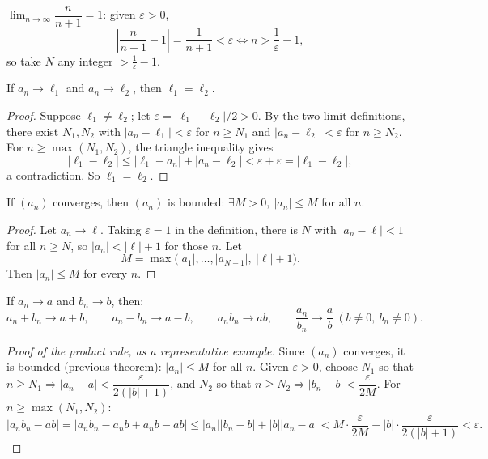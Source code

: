 \documentclass[11pt]{article}
\begin{document}
\begin{example}
$\lim_{n\to\infty}\dfrac{n}{n+1}=1$: given $\varepsilon>0$,
\[
\left|\frac{n}{n+1}-1\right| = \frac{1}{n+1} < \varepsilon \iff n > \frac1\varepsilon-1,
\]
so take $N$ any integer $>\tfrac1\varepsilon-1$.
\end{example}

\bigskip
\begin{theorem}
If $a_n\to\ell_1$ and $a_n\to\ell_2$, then $\ell_1=\ell_2$.
\end{theorem}
\begin{proof}
Suppose $\ell_1\neq\ell_2$; let $\varepsilon=|\ell_1-\ell_2|/2>0$. By the two limit definitions, there exist $N_1,N_2$ with $|a_n-\ell_1|<\varepsilon$ for $n\ge N_1$ and $|a_n-\ell_2|<\varepsilon$ for $n\ge N_2$. For $n\ge\max(N_1,N_2)$, the triangle inequality gives
\[
|\ell_1-\ell_2| \le |\ell_1-a_n|+|a_n-\ell_2| < \varepsilon+\varepsilon = |\ell_1-\ell_2|,
\]
a contradiction. So $\ell_1=\ell_2$.
\end{proof}

\begin{theorem}
If $(a_n)$ converges, then $(a_n)$ is bounded: $\exists M>0,\ |a_n|\le M$ for all $n$.
\end{theorem}
\begin{proof}
Let $a_n\to\ell$. Taking $\varepsilon=1$ in the definition, there is $N$ with $|a_n-\ell|<1$ for all $n\ge N$, so $|a_n|<|\ell|+1$ for those $n$. Let
\[
M = \max\big(|a_1|,\dots,|a_{N-1}|,\ |\ell|+1\big).
\]
Then $|a_n|\le M$ for every $n$.
\end{proof}

\bigskip
\begin{theorem}
If $a_n\to a$ and $b_n\to b$, then:
\[
a_n+b_n\to a+b, \qquad a_n-b_n\to a-b, \qquad a_nb_n\to ab, \qquad \frac{a_n}{b_n}\to\frac{a}{b}\ (b\neq0,\ b_n\neq0).
\]
\end{theorem}
\begin{proof}[Proof of the product rule, as a representative example]
Since $(a_n)$ converges, it is bounded (previous theorem): $|a_n|\le M$ for all $n$. Given $\varepsilon>0$, choose $N_1$ so that $n\ge N_1\Rightarrow|a_n-a|<\dfrac{\varepsilon}{2(|b|+1)}$, and $N_2$ so that $n\ge N_2\Rightarrow|b_n-b|<\dfrac{\varepsilon}{2M}$. For $n\ge\max(N_1,N_2)$:
\[
|a_nb_n-ab| = |a_nb_n-a_nb+a_nb-ab| \le |a_n||b_n-b| + |b||a_n-a| < M\cdot\frac{\varepsilon}{2M} + |b|\cdot\frac{\varepsilon}{2(|b|+1)} < \varepsilon.
\]
\end{proof}
\end{document}
